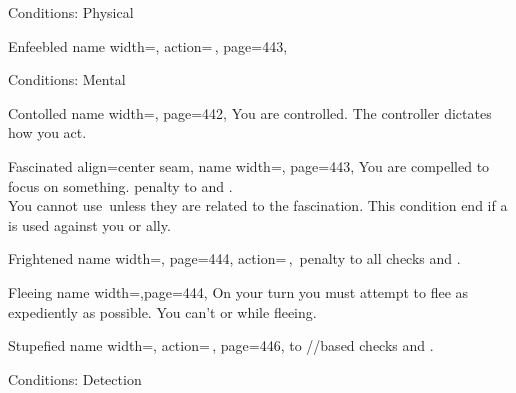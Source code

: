\begin{PageFront}
\begin{Tables}{\frontTableHeight}
\begin{Table}{Conditions: Physical}
\begin{entry}{Enfeebled}{%
                name width=\conditionLength,%
                action=\,\X,
                page=443,
            }
            \end{entry}
        \end{Table}
        \TableSpace
        \begin{Table}{Conditions: Mental}
            \begin{entry}{Contolled}{%
                name width=\conditionLength,%
                page=442,
            }
                You are controlled. The controller dictates how you act.\hfill
            \end{entry}
            \begin{entry}{Fascinated}{%
                align=center seam,
                name width=\conditionLength,
                page=443,
            }
                You are compelled to focus on something.  \Cirm penalty to \PerceptionT and .\\
                You cannot use \Concentrate\,unless they are related to the fascination. \hfill
                This condition end if a  is used against you or ally.
            \end{entry}
            \begin{entry}{Frightened}{%
                name width=\conditionLength,%
                page=444,
                action=\,\X,
            }
                \Numb{-\X}\,\Cirm penalty to all checks and \DCs. \hfill
            \end{entry}
            \begin{entry}{Fleeing}{%
                name width=\conditionLength,page=444,
            }
                On your turn you must attempt to flee as expediently as possible. \hfill
                You can't  or  while fleeing.
            \end{entry}
            \begin{entry}{Stupefied}{%
                name width=\conditionLength,%
                action=\,\X,
                page=446,
            }
                \Numb{-\X} \Status to \Intellegence\!/\Wisdom\!/\Charisma based checks and \DCs. \hfill
                 \Flat[][val=5+\X] 
            \end{entry}
        \end{Table}
        \TableSpace
        \begin{Table}{Conditions: Detection}

\end{Table}
\end{Tables}
\end{PageFront}
